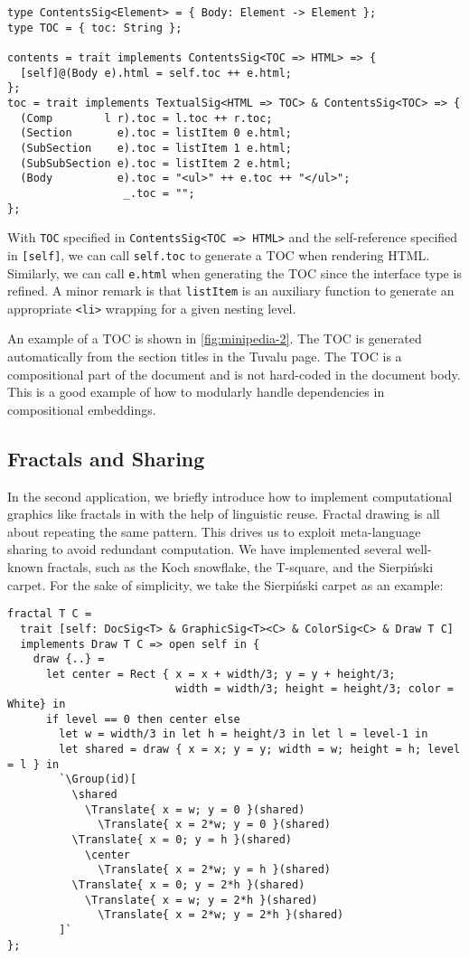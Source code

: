 \begin{lstlisting}
type ContentsSig<Element> = { Body: Element -> Element };
type TOC = { toc: String };

contents = trait implements ContentsSig<TOC => HTML> => {
  [self]@(Body e).html = self.toc ++ e.html;
};
toc = trait implements TextualSig<HTML => TOC> & ContentsSig<TOC> => {
  (Comp        l r).toc = l.toc ++ r.toc;
  (Section       e).toc = listItem 0 e.html;
  (SubSection    e).toc = listItem 1 e.html;
  (SubSubSection e).toc = listItem 2 e.html;
  (Body          e).toc = "<ul>" ++ e.toc ++ "</ul>";
                  _.toc = "";
};
\end{lstlisting}

\noindent With \lstinline{TOC} specified in \lstinline{ContentsSig<TOC => HTML>}
and the self-reference specified in \lstinline{[self]}, we can call
\lstinline{self.toc} to generate a TOC when rendering HTML. Similarly, we can
call \lstinline{e.html} when generating the TOC since the interface type is
refined. A minor remark is that \lstinline{listItem} is an auxiliary function to
generate an appropriate \lstinline{<li>} wrapping for a given nesting level.

An example of a TOC is shown in \autoref{fig:minipedia-2}. The TOC is generated
automatically from the section titles in the Tuvalu page. The TOC is a
compositional part of the document and is not hard-coded in the document body.
This is a good example of how to modularly handle dependencies in compositional
embeddings.

\subsection{Fractals and Sharing} \label{sec:fractal}

In the second application, we briefly introduce how to implement computational
graphics like fractals in \ExT with the help of linguistic reuse. Fractal
drawing is all about repeating the same pattern. This drives us to exploit
meta-language sharing to avoid redundant computation. We have implemented
several well-known fractals, such as the Koch snowflake, the T-square, and the
Sierpiński carpet. For the sake of simplicity, we take the Sierpiński carpet as
an example:

\begin{lstlisting}
fractal T C =
  trait [self: DocSig<T> & GraphicSig<T><C> & ColorSig<C> & Draw T C]
  implements Draw T C => open self in {
    draw {..} =
      let center = Rect { x = x + width/3; y = y + height/3;
                          width = width/3; height = height/3; color = White} in
      if level == 0 then center else
        let w = width/3 in let h = height/3 in let l = level-1 in
        let shared = draw { x = x; y = y; width = w; height = h; level = l } in
        `\Group(id)[
          \shared
            \Translate{ x = w; y = 0 }(shared)
              \Translate{ x = 2*w; y = 0 }(shared)
          \Translate{ x = 0; y = h }(shared)
            \center
              \Translate{ x = 2*w; y = h }(shared)
          \Translate{ x = 0; y = 2*h }(shared)
            \Translate{ x = w; y = 2*h }(shared)
              \Translate{ x = 2*w; y = 2*h }(shared)
        ]`
};
\end{lstlisting}

